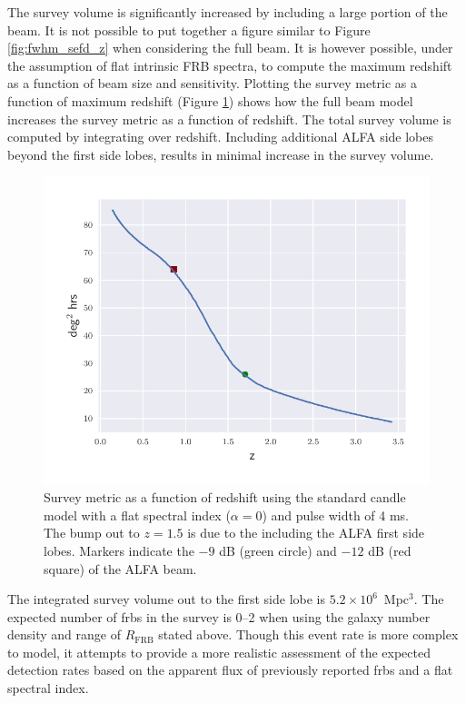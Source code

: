 \documentclass[a4paper,fleqn,usenatbib]{mnras}
\begin{document}
The survey volume is significantly increased by including a large portion of the
beam. It is not possible to put together a figure similar to Figure
\ref{fig:fwhm_sefd_z} when considering the full beam. It is however possible,
under the assumption of flat intrinsic FRB spectra, to compute the maximum
redshift as a function of beam size and sensitivity. Plotting the survey metric
as a function of maximum redshift (Figure \ref{fig:full_sefd_z}) shows how the
full beam model increases the survey metric as a function of redshift. The total
survey volume is computed by integrating over redshift.  Including additional
ALFA side lobes beyond the first side lobes, results in minimal increase in the
survey volume.

\begin{figure}
    \includegraphics[width=1.0\linewidth]{figures/full_sefd_z_relation.pdf}
    \caption{Survey metric as a function of redshift using the standard candle
    model with a flat spectral index ($\alpha=0$) and pulse width of 4 ms. The
    bump out to $z=1.5$ is due to the including the ALFA first side lobes.
    Markers indicate the $-9$ dB (green circle) and $-12$ dB (red square) of the
    ALFA beam.
    }
    \label{fig:full_sefd_z}
\end{figure}

The integrated survey volume out to the first side lobe is $5.2 \times
10^6$~Mpc$^3$. The expected number of \glspl{frb} in the survey is 0--2 when
using the galaxy number density and range of $R_{\textrm{FRB}}$ stated above.
Though this event rate is more complex to model, it attempts to provide a more
realistic assessment of the expected detection rates based on the apparent flux
of previously reported \glspl{frb} and a flat spectral index.
\end{document}
